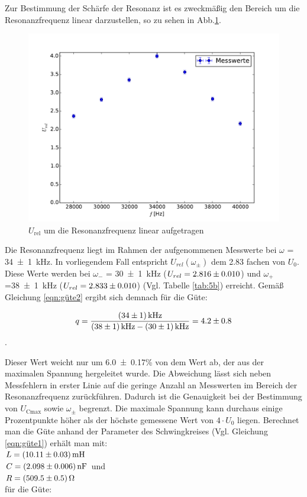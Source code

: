 Zur Bestimmung der Schärfe der Resonanz ist es zweckmäßig den Bereich um die
Resonanzfrequenz linear darzustellen, so zu sehen in Abb.\ref{fig:5clin}.
\begin{figure}[H]
  \centering
  \includegraphics[width=\textwidth]{5c2.pdf}
  \caption{$U_ \text{rel}$ um die Resonanzfrequenz linear aufgetragen}
  \label{fig:5clin}
\end{figure}
Die Resonanzfrequenz liegt im Rahmen der aufgenommenen Messwerte bei
$\omega$ = \SI{34 +- 1}{\kilo\hertz}.
In vorliegendem Fall entspricht $U_{rel}(\omega_{\pm})$ dem 2.83 fachen von $U_0$.
Diese Werte werden bei $\omega_-$ = \SI{30+-1}{\kilo\hertz}
($U_{rel}=\num{2.816+-0.01}$) und
$\omega_+$=\SI{38+-1}{\kilo\hertz} ($U_{rel} = \num{2.833+-0.01}$)
(Vgl. Tabelle \ref{tab:5b}) erreicht.
Gemäß Gleichung \ref{eqn:güte2} ergibt
sich demnach für die Güte:

$$q = \frac{\SI{34+-1}{\kilo\hertz}}{\SI{38+-1}{\kilo\hertz}-\SI{30+-1}
{\kilo\hertz}} = \num{4.2+-0.8}$$ .

Dieser Wert weicht nur um \num{6.0+-0.17}\% von dem Wert ab, der aus der maximalen
Spannung hergeleitet wurde. Die Abweichung lässt sich neben Messfehlern in erster
Linie auf die geringe Anzahl an Messwerten im Bereich der Resonanzfrequenz
zurückführen. Dadurch ist die Genauigkeit bei der Bestimmung von
$U_\text{Cmax}$ sowie $\omega_\pm$ begrenzt. Die maximale Spannung kann durchaus
einige Prozentpunkte höher als der höchste gemessene Wert von $4\cdot U_0$
liegen.
Berechnet man die Güte anhand der Parameter des Schwingkreises
(Vgl. Gleichung \ref{eqn:güte1}) erhält man mit: \\
$L = \SI{10.11 +- 0.03}{\milli\henry}$  \\
$C = \SI{2.098 +- 0.006}{\nano\farad}$ und \\
$R = \SI{509.5 +- 0.5}{\ohm}$ \\
für die Güte:

